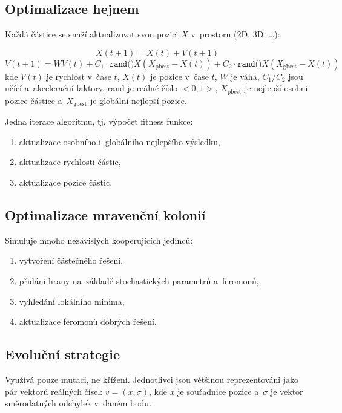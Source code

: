 \subsection{Optimalizace hejnem}

Každá částice se snaží aktualizovat svou pozici $X$ v~prostoru (2D, 3D, \dots):

$$X(t+1) = X(t) + V(t+1)$$
$$V(t+1) = WV(t) + C_1 \cdot \mathrm{\texttt{rand()}} X (X_\mathrm{pbest} - X(t)) + C_2 \cdot \mathrm{\texttt{rand()}} X (X_\mathrm{gbest} - X(t))$$
%
kde $V(t)$ je rychlost v~čase $t$, $X(t)$ je pozice v~čase $t$, $W$ je váha, $C_1$/$C_2$ jsou učící a~akcelerační faktory, rand je reálné číslo $<0, 1>$, $X_\mathrm{pbest}$ je nejlepší osobní pozice částice a~$X_\mathrm{gbest}$ je globální nejlepší pozice.

Jedna iterace algoritmu, tj. výpočet fitness funkce:

\begin{enumerate}
\item aktualizace osobního i~globálního nejlepšího výsledku,
\item aktualizace rychlosti částic,
\item aktualizace pozice částic.
\end{enumerate}

\subsection{Optimalizace mravenční kolonií}

Simuluje mnoho nezávislých kooperujících jedinců:

\begin{enumerate}
\item vytvoření částečného řešení,
\item přidání hrany na~základě stochastických parametrů a~feromonů,
\item vyhledání lokálního minima,
\item aktualizace feromonů dobrých řešení.
\end{enumerate}

\subsection{Evoluční strategie}

Využívá pouze mutaci, ne křížení.
Jednotlivci jsou většinou reprezentováni jako pár vektorů reálných čísel: $v = (x, \sigma)$, kde $x$ je souřadnice pozice a~$\sigma$ je vektor směrodatných odchylek v~daném bodu.

